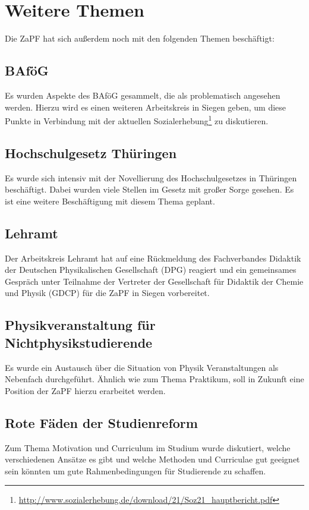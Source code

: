 \documentclass[a4paper]{article}
\begin{document}
\section*{Weitere Themen}

Die ZaPF hat sich außerdem noch mit den folgenden Themen beschäftigt:

\subsection*{BAföG}
Es wurden Aspekte des BAföG gesammelt, die als problematisch angesehen werden.
Hierzu wird es einen weiteren Arbeitskreis in Siegen geben, um diese Punkte in
Verbindung mit der aktuellen
Sozialerhebung\footnote{\href{http://www.sozialerhebung.de/download/21/Soz21_hauptbericht.pdf}{\url{http://www.sozialerhebung.de/download/21/Soz21_hauptbericht.pdf}}}
zu diskutieren. 

\subsection*{Hochschulgesetz Thüringen}
Es wurde sich intensiv mit der Novellierung des Hochschulgesetzes in Thüringen
beschäftigt. Dabei wurden viele Stellen im Gesetz mit großer Sorge gesehen. Es
ist eine weitere Beschäftigung mit diesem Thema geplant.

\subsection*{Lehramt}
Der Arbeitskreis Lehramt hat auf eine Rückmeldung des Fachverbandes Didaktik
der Deutschen Physikalischen Gesellschaft (DPG) reagiert und ein gemeinsames
Gespräch unter Teilnahme der Vertreter der Gesellschaft für Didaktik der Chemie
und Physik (GDCP) für die ZaPF in Siegen vorbereitet.

\subsection*{Physikveranstaltung für Nichtphysikstudierende}
Es wurde ein Austausch über die Situation von Physik Veranstaltungen als
Nebenfach durchgeführt. Ähnlich wie zum Thema Praktikum, soll in Zukunft eine
Position der ZaPF hierzu erarbeitet werden. 

\subsection*{Rote Fäden der Studienreform}
Zum Thema Motivation und Curriculum im Studium wurde diskutiert, welche
verschiedenen Ansätze es gibt und welche Methoden und Curriculae gut geeignet
sein könnten um gute Rahmenbedingungen für Studierende zu schaffen.
\end{document}
